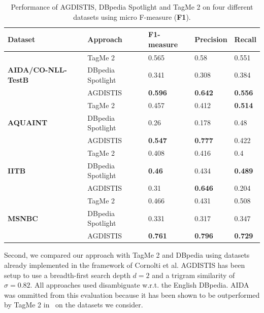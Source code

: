 \begin{table}
    \centering
\caption{Performance of AGDISTIS, DBpedia Spotlight and TagMe 2 on four different datasets using micro F-measure (\textbf{F1}).}
\begin{tabular}[tb]{@{}lllll@{}}
\toprule
Dataset                            & Approach          & \textbf{F1-measure}             & \textbf{Precision} & \textbf{Recall} \\ \midrule
\multirow{3}{*}{\begin{minipage}{0.8in}\textbf{AIDA/CO-NLL-TestB}\end{minipage}} & TagMe 2           & 0.565          & 0.58      & 0.551  \\
                                   & DBpedia Spotlight & 0.341          & 0.308     & 0.384  \\
                                   & AGDISTIS          & \textbf{0.596} & \textbf{0.642}     & \textbf{0.556}  \\ \midrule
\multirow{3}{*}{\textbf{AQUAINT}}  & TagMe 2           & 0.457          & 0.412     & \textbf{0.514}  \\
                                   & DBpedia Spotlight & 0.26           & 0.178     & 0.48   \\
                                   & AGDISTIS          & \textbf{0.547} & \textbf{0.777}     & 0.422  \\\midrule
\multirow{3}{*}{\textbf{IITB}}     & TagMe 2           & 0.408          & 0.416     & 0.4    \\
                                   & DBpedia Spotlight & \textbf{0.46}  & 0.434     & \textbf{0.489}  \\
                                   & AGDISTIS          & 0.31           & \textbf{0.646}     & 0.204  \\\midrule
\multirow{3}{*}{\textbf{MSNBC}}    & TagMe 2           & 0.466          & 0.431     & 0.508  \\
                                   & DBpedia Spotlight & 0.331          & 0.317     & 0.347  \\
                                   & AGDISTIS          & \textbf{0.761} & \textbf{0.796}     & \textbf{0.729}  \\ \bottomrule
\end{tabular}
\label{tab:evalnew}
\end{table}

Second, we compared our approach with TagMe 2 and DBpedia using datasets already implemented in the framework of Cornolti et al.
AGDISTIS has been setup to use a breadth-first search depth $d=2$ and a trigram similarity of $\sigma=0.82$.
All approaches used disambiguate w.r.t. the English DBpedia.
AIDA was ommitted from this evaluation because it has been shown to be outperformed by TagMe 2 in~\cite{cornolti} on the datasets we consider. 

